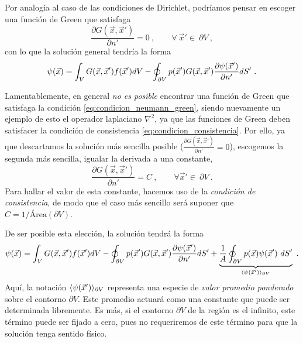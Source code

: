 Por analogía al caso de las condiciones de Dirichlet, podríamos pensar en escoger una función de Green que satisfaga
\begin{equation} \label{eq:condicion_neumann_green}
    \frac{\partial G(\vec{x}, \vec{x}')}{\partial n'} = 0 \ , \qquad \forall \ \vec{x}' \in \ \partial V \ ,
\end{equation}
con lo que la solución general tendría la forma
\begin{equation}\label{eq:solucion_neumann_inicial}
    \psi(\vec{x}) = \int_V G(\vec{x}, \vec{x}') f(\vec{x}') dV - \oint_{\partial V} p(\vec{x} ') G(\vec{x}, \vec{x}') \frac{\partial \psi(\vec{x}')}{\partial n'} dS' \ .
\end{equation}

Lamentablemente, en general \emph{no es posible} encontrar una función de Green que satisfaga la condición \eqref{eq:condicion_neumann_green}, siendo nuevamente un ejemplo de esto el operador laplaciano $\nabla^2$, ya que las funciones de Green deben satisfacer la condición de consistencia \eqref{eq:condicion_consistencia}. Por ello, ya que descartamos la solución más sencilla posible ($\frac{\partial G(\vec{x}, \vec{x}')}{\partial n'} = 0$), escogemos la segunda más sencilla, igualar la derivada a una constante,
\begin{equation}
    \frac{\partial G(\vec{x}, \vec{x}')}{\partial n'} = C \ , \qquad \forall \vec{x}' \in \ \partial V \ .
\end{equation}
Para hallar el valor de esta constante, hacemos uso de la \emph{condición de consistencia}, de modo que el caso más sencillo será suponer que $C = 1/\text{Área}(\partial V)$.

De ser posible esta elección, la solución tendrá la forma
\begin{equation}\label{eq:solucion_neumann}
    \psi(\x) = \int_V G(\x, \x') f(\x') dV - \oint_{\partial V} p(\x ') G(\x, \x') \frac{\partial \psi(\x')}{\partial n'} dS' + \underbrace{\frac{1}{A} \oint_{\partial V} p(\x) \psi(\x') \ dS'}_{\langle \psi(\x') \rangle_{\partial V}} \ .
\end{equation}
Aquí, la notación $\langle \psi(\vec{x}') \rangle_{\partial V}$ representa una especie de \emph{valor promedio ponderado} sobre el contorno $\partial V$. Este promedio actuará como una constante que puede ser determinada libremente. Es más, si el contorno $\partial V$ de la región es el infinito, este término puede ser fijado a cero, pues no requeriremos de este término para que la solución tenga sentido físico.

